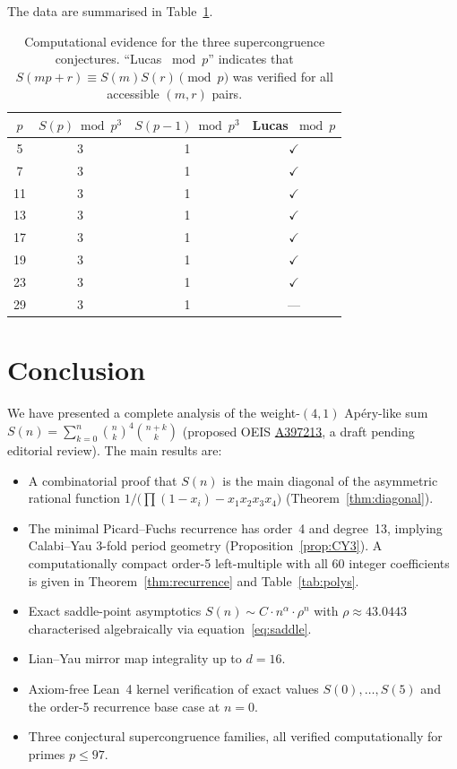 \documentclass[11pt, a4paper]{article}
\begin{document}
\medskip

The data are summarised in Table~\ref{tab:cong}.

\begin{table}[ht]
\centering
\begin{tabular}{@{}cccc@{}}
\toprule
$p$ & $S(p)\bmod p^3$ & $S(p-1)\bmod p^3$ & Lucas $\bmod p$ \\
\midrule
5  & 3 & 1 & $\checkmark$ \\
7  & 3 & 1 & $\checkmark$ \\
11 & 3 & 1 & $\checkmark$ \\
13 & 3 & 1 & $\checkmark$ \\
17 & 3 & 1 & $\checkmark$ \\
19 & 3 & 1 & $\checkmark$ \\
23 & 3 & 1 & $\checkmark$ \\
29 & 3 & 1 & --- \\
\bottomrule
\end{tabular}
\caption{%
  Computational evidence for the three supercongruence conjectures.
  ``Lucas $\bmod p$'' indicates that $S(mp+r)\equiv S(m)S(r)\pmod{p}$
  was verified for all accessible $(m,r)$ pairs.%
}
\label{tab:cong}
\end{table}


\section{Conclusion}\label{sec:conclusion}

We have presented a complete analysis of the weight-$(4,1)$ Ap\'ery-like
sum $S(n)=\sum_{k=0}^n\binom{n}{k}^4\binom{n+k}{k}$ (proposed OEIS \href{https://oeis.org/draft/A397213}{A397213}, a draft pending editorial review).  The main results are:
\begin{itemize}
  \item A combinatorial proof that $S(n)$ is the main diagonal of the
        asymmetric rational function $1/\bigl(\prod(1-x_i) - x_1 x_2 x_3 x_4\bigr)$
        (Theorem~\ref{thm:diagonal}).
  \item The minimal Picard--Fuchs recurrence has order~4 and degree~13,
        implying Calabi--Yau 3-fold period geometry
        (Proposition~\ref{prop:CY3}).  A computationally compact order-5
        left-multiple with all 60 integer coefficients is given in
        Theorem~\ref{thm:recurrence} and Table~\ref{tab:polys}.
  \item Exact saddle-point asymptotics $S(n)\sim C\cdot n^\alpha\cdot\rho^n$
        with $\rho\approx 43.0443$ characterised algebraically via
        equation~\eqref{eq:saddle}.
  \item Lian--Yau mirror map integrality up to $d=16$.
  \item Axiom-free Lean~4 kernel verification of exact values $S(0),\ldots,S(5)$
        and the order-5 recurrence base case at $n=0$.
  \item Three conjectural supercongruence families, all verified
        computationally for primes $p\le 97$.
\end{itemize}
\end{document}
